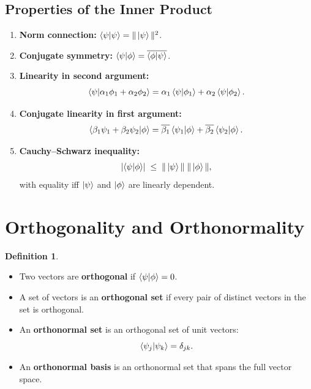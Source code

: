 \documentclass[11pt]{article}
\theoremstyle{definition}
\newtheorem{definition}{Definition}[section]
\begin{document}
\subsection{Properties of the Inner Product}

\begin{enumerate}[label=(\alph*)]
    \item \textbf{Norm connection:} $\braket{\psi}{\psi}=\|\ket{\psi}\|^2$.
    \item \textbf{Conjugate symmetry:} $\braket{\psi}{\phi}=\overline{\braket{\phi}{\psi}}$.
    \item \textbf{Linearity in second argument:}
    \[
        \braket{\psi}{\alpha_1\phi_1+\alpha_2\phi_2}
        = \alpha_1\braket{\psi}{\phi_1}+\alpha_2\braket{\psi}{\phi_2}.
    \]
    \item \textbf{Conjugate linearity in first argument:}
    \[
        \bra{\beta_1\psi_1+\beta_2\psi_2}\ket{\phi}
        = \overline{\beta_1}\braket{\psi_1}{\phi}+\overline{\beta_2}\braket{\psi_2}{\phi}.
    \]
    \item \textbf{Cauchy--Schwarz inequality:}
    \[
        |\!\braket{\psi}{\phi}\!| \;\le\; \|\ket{\psi}\|\;\|\ket{\phi}\|,
    \]
    with equality iff $\ket{\psi}$ and $\ket{\phi}$ are linearly dependent.
\end{enumerate}

\section{Orthogonality and Orthonormality}

\begin{definition}\leavevmode
\begin{itemize}
    \item Two vectors are \textbf{orthogonal} if $\braket{\psi}{\phi}=0$.
    \item A set of vectors is an \textbf{orthogonal set} if every pair of distinct vectors in the set is orthogonal.
    \item An \textbf{orthonormal set} is an orthogonal set of unit vectors:
    \[
        \braket{\psi_j}{\psi_k} = \delta_{jk}.
    \]
    \item An \textbf{orthonormal basis} is an orthonormal set that spans the full vector space.
\end{itemize}
\end{definition}
\end{document}
